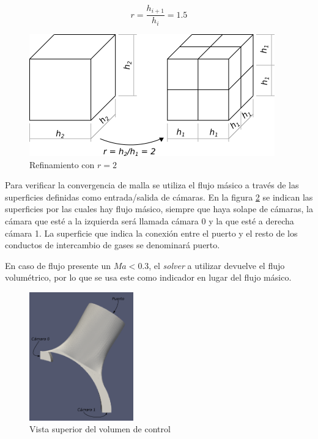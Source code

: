 \documentclass[11pt]{article}
\begin{document}
\begin{equation}
    \label{eq:r}
    r = \frac{h_{i+1}}{h_{i}} = 1.5
\end{equation}


\begin{figure}
    \centering
    \includegraphics{celdas_block_mesh.png}
    \caption{Refinamiento con $r=2$}\label{fig:celdas_bm}
\end{figure}

Para verificar la convergencia de malla se utiliza el flujo másico a través
de las superficies definidas como entrada/salida de cámaras.
%
En la figura \ref{fig:parches} se indican las superficies por las cuales hay
flujo másico, siempre que haya solape de cámaras, la cámara que esté a la
izquierda será llamada cámara 0 y la que esté a derecha cámara 1.
%
La superficie que indica la conexión entre el puerto y el resto de los conductos
de intercambio de gases se denominará puerto.


En caso de flujo presente un $Ma < 0.3$, el \emph{solver} a utilizar devuelve
el flujo volumétrico, por lo que se usa este como indicador en lugar del flujo
másico.

\begin{figure}
    \centering
    \includegraphics[width=0.4\textwidth]{nombres-parches.png}
    \caption{Vista superior del volumen de control}\label{fig:parches}
\end{figure}
\end{document}
